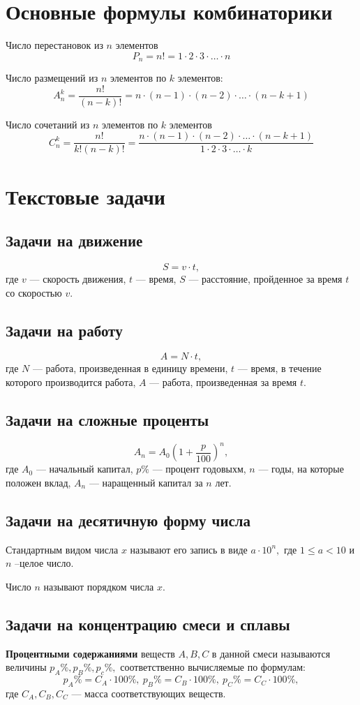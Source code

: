 \documentclass[a5paper, 8pt]{extarticle}
\begin{document}
\section{Основные формулы комбинаторики}

Число перестановок из $n$ элементов 
$$P_n=n!=1\cdot 2\cdot 3\cdot \dots \cdot n$$

Число размещений из $n$ элементов по $k$ элементов:
$$A_n^k=\frac{n!}{(n-k)!}=n\cdot (n-1)\cdot (n-2)\cdot \dots \cdot (n-k+1)$$

Число сочетаний из $n$ элементов по $k$ элементов
$$C_n^k=\frac{n!}{k!(n-k)!}=\frac{n\cdot (n-1)\cdot (n-2)\cdot \dots \cdot (n-k+1)}{1\cdot 2\cdot 3\cdot \dots \cdot k}$$

\section{Текстовые задачи}
\subsection{Задачи на движение}
$$S=v\cdot t,$$
где $v$ --- скорость движения, $t$ --- время, $S$ --- расстояние, пройденное за время $t$ со скоростью $v.$
\subsection{Задачи на работу}
$$A=N\cdot t,$$
где $N$ --- работа, произведенная в единицу времени, $t$ --- время, в течение которого производится работа, $A$ --- работа, произведенная за время $t.$
\subsection{Задачи на сложные проценты}
$$A_n=A_0\left( 1+\frac{p}{100}\right)^n ,$$
где $A_0$ --- начальный капитал, $p\%$ --- процент годовыхм, $n$ --- годы, на которые положен вклад, $A_n$ --- наращенный капитал за $n$ лет. 
\subsection{Задачи на десятичную форму числа}
Стандартным видом числа $x$ называют его запись в виде $a\cdot 10^n,$ где $1\le a < 10$ и $n$ --целое число.

Число $n$ называют порядком числа $x.$ 

\subsection{Задачи на концентрацию смеси и сплавы}
\textbf{Процентными содержаниями} веществ $A, B, C$ в данной смеси называются величины $p_A\%, p_B\%, p_c\%,$ соответственно вычисляемые по формулам:
$$
p_A\%=C_A\cdot 100\%,\  p_B\%=C_B\cdot 100\%,\ p_C\%=C_C\cdot 100\%,
$$
где $C_A, C_B, C_C$ --- масса соответствующих веществ.
\end{document}

